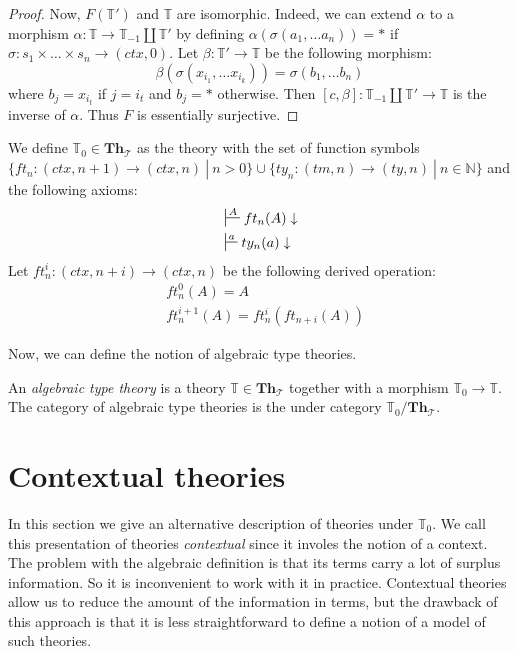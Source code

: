 \documentclass[reqno]{amsart}
\theoremstyle{definition}
\theoremstyle{remark}
\newcommand{\cat}[1]{\mathbf{#1}}
\newcommand{\Th}{\cat{Th}}
\newcommand{\ThT}{\Th_{\mathcal{T}}}
\numberwithin{figure}{section}
\begin{document}
\begin{proof}
Now, $F(\mathbb{T}')$ and $\mathbb{T}$ are isomorphic.
Indeed, we can extend $\alpha$ to a morphism $\alpha : \mathbb{T} \to \mathbb{T}_{-1} \amalg \mathbb{T}'$
by defining $\alpha(\sigma(a_1, \ldots a_n)) = *$ if $\sigma : s_1 \times \ldots \times s_n \to (ctx,0)$.
Let $\beta : \mathbb{T}' \to \mathbb{T}$ be the following morphism:
\[ \beta(\sigma(x_{i_1}, \ldots x_{i_k})) = \sigma(b_1, \ldots b_n) \]
where $b_j = x_{i_t}$ if $j = i_t$ and $b_j = *$ otherwise.
Then $[c,\beta] : \mathbb{T}_{-1} \amalg \mathbb{T}' \to \mathbb{T}$ is the inverse of $\alpha$.
Thus $F$ is essentially surjective.
\end{proof}

We define $\mathbb{T}_0 \in \ThT$ as the theory with the set of function symbols $\{ ft_n : (ctx,n+1) \to (ctx,n)\ |\ n > 0 \} \cup \{ ty_n : (tm,n) \to (ty,n)\ |\ n \in \mathbb{N} \}$ and the following axioms:
\begin{align*}
& \sststile{}{A} ft_n(A) \downarrow \\
& \sststile{}{a} ty_n(a) \downarrow
\end{align*}
Let $ft^i_n : (ctx,n+i) \to (ctx,n)$ be the following derived operation:
\begin{align*}
& ft^0_n(A) = A \\
& ft^{i+1}_n(A) = ft^i_n(ft_{n+i}(A))
\end{align*}

Now, we can define the notion of algebraic type theories.

\begin{defn}
An \emph{algebraic type theory} is a theory $\mathbb{T} \in \ThT$ together with a morphism $\mathbb{T}_0 \to \mathbb{T}$.
The category of algebraic type theories is the under category $\mathbb{T}_0/\ThT$.
\end{defn}

\section{Contextual theories}

In this section we give an alternative description of theories under $\mathbb{T}_0$.
We call this presentation of theories \emph{contextual} since it involes the notion of a context.
The problem with the algebraic definition is that its terms carry a lot of surplus information.
So it is inconvenient to work with it in practice.
Contextual theories allow us to reduce the amount of the information in terms,
but the drawback of this approach is that it is less straightforward to define a notion of a model of such theories.
\end{document}
